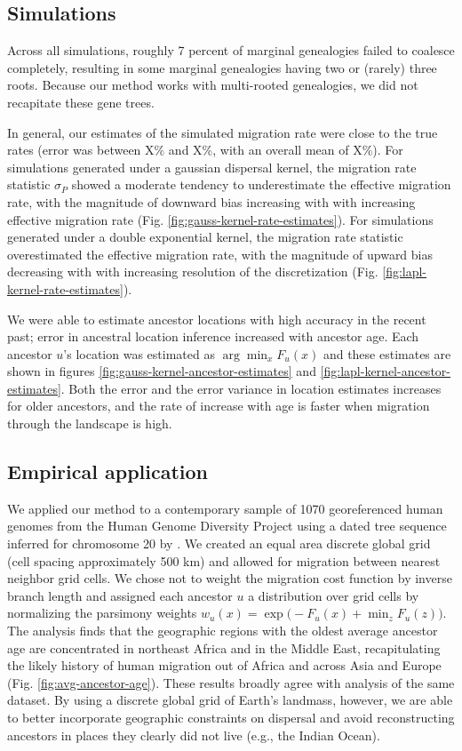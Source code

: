 \subsection{Simulations}

Across all simulations, roughly 7 percent of marginal genealogies failed to
coalesce completely, resulting in some marginal genealogies having two or (rarely)
three roots. Because our method works with multi-rooted genealogies, we did
not recapitate these gene trees.

In general, our estimates of the simulated migration rate were close to the 
true rates (error was between X\% and X\%, with an overall mean of X\%).
For simulations generated under a gaussian dispersal kernel, the migration
rate statistic $\sigma_P$ showed a moderate tendency to underestimate the 
effective migration rate, with the magnitude of downward bias increasing with 
with increasing effective migration rate 
(Fig. \ref{fig:gauss-kernel-rate-estimates}). For simulations generated under
a double exponential kernel, the migration rate statistic overestimated the
effective migration rate, with the magnitude of upward bias decreasing with 
with increasing resolution of the discretization
(Fig. \ref{fig:lapl-kernel-rate-estimates}).

We were able to estimate ancestor locations with high accuracy in the recent past; 
error in ancestral location inference increased with ancestor age.
Each ancestor $u$'s location was estimated as $\arg\min_x F_u(x)$ and these
estimates are shown in figures \ref{fig:gauss-kernel-ancestor-estimates} and 
\ref{fig:lapl-kernel-ancestor-estimates}. Both the error and the error variance
in location estimates increases for older ancestors, and the rate of increase
with age is faster when migration through the landscape is high. 

\subsection{Empirical application}

We applied our method to a contemporary sample of 1070 georeferenced human
genomes from the Human Genome Diversity Project using a dated tree sequence
inferred for chromosome 20 by \citet{Wohns_etal_2022}. We created an equal 
area discrete global grid \citep{Barnes_Sahr_2023} (cell spacing approximately 
500 km) and allowed for migration between nearest neighbor grid cells. We
chose not to weight the migration cost function by inverse branch length and
assigned each ancestor $u$ a distribution over grid cells by normalizing the 
parsimony weights $w_u(x) = \exp\bigl(-F_u(x) + \min_z F_u(z)\bigr)$.
The analysis finds that the geographic regions with the oldest average ancestor
age are concentrated in northeast Africa and in the Middle East, recapitulating
the likely history of human migration out of Africa and across Asia and Europe 
(Fig. \ref{fig:avg-ancestor-age}). These results broadly agree with 
\citet{Wohns_etal_2022} analysis of the same dataset. By using a discrete global 
grid of Earth's landmass, however, we are able to better incorporate geographic
constraints on dispersal and avoid reconstructing ancestors in places they
clearly did not live (e.g., the Indian Ocean).

